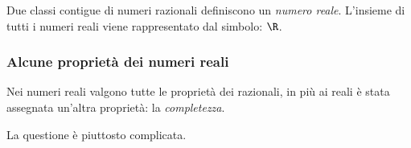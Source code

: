 Due classi contigue di numeri razionali definiscono un \emph{numero reale}. 
L'insieme di tutti i numeri reali viene rappresentato dal simbolo: \(\R\). 



\subsubsection{Alcune proprietà dei numeri reali} 
\label{subsubsec:insnum_reali}

% 
% 


Nei numeri reali valgono tutte le proprietà dei razionali, in più ai reali è 
stata assegnata un'altra proprietà: la \emph{completezza}.

La questione è piuttosto complicata. 



